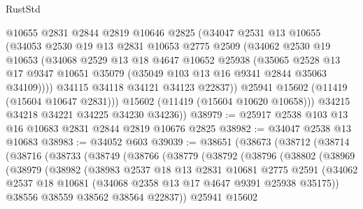 \begin{lexlean}{RustStd}
\begin{coremodule}
            @10655
            @2831
            @2844
            @2819
            @10646
            @2825
            (@34047
              @2531
              @13
              @10655
              (@34053
                @2530
                @19
                @13
                @2831
                @10653
                @2775
                @2509
                (@34062
                  @2530
                  @19
                  @10653
                  (@34068
                    @2529
                    @13
                    @18
                    @4647
                    @10652
                    @25938
                    (@35065
                      @2528
                      @13
                      @17
                      @9347
                      @10651
                      @35079
                      (@35049 @103 @13 @16 @9341 @2844 @35063 @34109))))
                @34115
                @34118
                @34121
                @34123
                @22837))
            @25941
            @15602
            (@11419 (@15604 @10647 @2831)))
          @15602
          (@11419 (@15604 @10620 @10658)))
        @34215
        @34218
        @34221
        @34225
        @34230
        @34236))
@38979 := @25917 @2538 @103 @13 @16 @10683 @2831 @2844 @2819 @10676 @2825
@38982 := @34047 @2538 @13 @10683
@38983 := @34052 @603
@39039 := @38651
    (@38673
      (@38712
        (@38714
          (@38716
            (@38733
              (@38749
                (@38766
                  (@38779
                    (@38792
                      (@38796
                        (@38802
                          (@38969
                            (@38979
                              (@38982
                                (@38983
                                  @2537
                                  @18
                                  @13
                                  @2831
                                  @10681
                                  @2775
                                  @2591
                                  (@34062
                                    @2537
                                    @18
                                    @10681
                                    (@34068 @2358 @13 @17 @4647 @9391 @25938 @35175))
                                  @38556
                                  @38559
                                  @38562
                                  @38564
                                  @22837))
                              @25941
                              @15602

\end{coremodule}
\end{lexlean}
